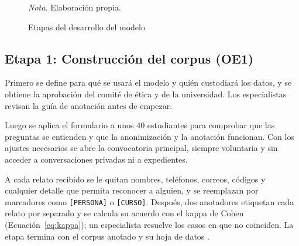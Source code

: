 \begin{figure}[H]
\caption{Etapas del desarrollo del modelo}
\label{fig:fases}
\centering
{}

\raggedright\textit{Nota.} Elaboración propia.
\end{figure}

\subsection{Etapa 1: Construcción del corpus (OE1)}
Primero se define para qué se usará el modelo y quién custodiará los datos, y se obtiene la aprobación del comité de ética y de la universidad. Los especialistas revisan la guía de anotación antes de empezar.

Luego se aplica el formulario a unos 40 estudiantes para comprobar que las preguntas se entienden y que la anonimización y la anotación funcionan. Con los ajustes necesarios se abre la convocatoria principal, siempre voluntaria y sin acceder a conversaciones privadas ni a expedientes.

A cada relato recibido se le quitan nombres, teléfonos, correos, códigos y cualquier detalle que permita reconocer a alguien, y se reemplazan por marcadores como \texttt{[PERSONA]} o \texttt{[CURSO]}. Después, dos anotadores etiquetan cada relato por separado y se calcula su acuerdo con el kappa de Cohen (Ecuación~\ref{eq:kappa}); un especialista resuelve los casos en que no coinciden. La etapa termina con el corpus anotado y su hoja de datos \citep{gebru2021}.

